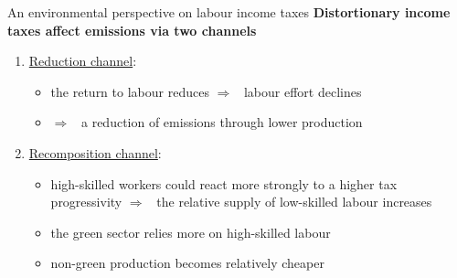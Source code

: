 \documentclass[11pt,aspectratio=169]{beamer}
\newcommand{\ar}{$\Rightarrow$ \ }
\begin{document}
\begin{frame}{An environmental perspective on labour income taxes}
\alert{\textbf{Distortionary income taxes affect emissions via two channels}}
\begin{enumerate}
	\item<+-> \underline{Reduction channel}: 
	\begin{itemize}
		\item the return to labour reduces \ar labour effort declines
		\item \ar a reduction of emissions through lower production
	\end{itemize}
	\item<+-> \underline{Recomposition channel}:
	\begin{itemize}
		\item  high-skilled workers could react more strongly to a higher tax progressivity \ar the relative supply of low-skilled labour increases
		\item the green sector relies more on high-skilled labour
		\item non-green production becomes relatively cheaper
	\end{itemize}
\end{enumerate}
\end{frame}
\end{document}
